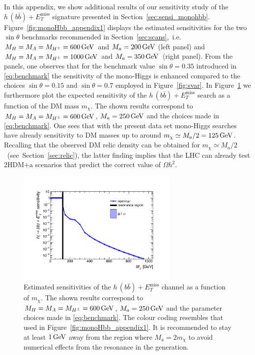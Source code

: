 \documentclass[a4paper, 11pt,notoc]{article}
\newcommand{\MET}{\ensuremath{E_T^\mathrm{miss}}\xspace}
\newcommand{\mA}{\ensuremath{M_{A}}\xspace}
\newcommand{\ma}{\ensuremath{M_{a}}\xspace}
\newcommand{\mH}{\ensuremath{M_{H}}\xspace}
\newcommand{\mHc}{\ensuremath{M_{H^{\pm}}}\xspace}
\newcommand{\hdma}{\ensuremath{\textrm{2HDM+a}}\xspace}
\begin{document}
In this appendix, we  show additional results  of our sensitivity study of the $h \, (b \bar b)+\MET$ signature presented in Section~\ref{sec:sensi_monohbb}. Figure~\ref{fig:monoHbb_appendix1} displays the estimated sensitivities for the two $\sin \theta$ benchmarks recommended in Section~\ref{sec:scans},~i.e.~$\mH = \mA = \mHc = 600 \, {\rm GeV}$ and $\ma = 200 \, {\rm GeV}$ (left panel) and $\mH = \mA = \mHc = 1000 \, {\rm GeV}$ and $\ma = 350 \, {\rm GeV}$~(right panel). From the panels, one observes that for the benchmark value $\sin \theta = 0.35$ introduced in \eqref{eq:benchmark} the sensitivity of the mono-Higgs is enhanced compared to the choices  $\sin \theta = 0.15$ and  $\sin \theta = 0.7$ employed in Figure~\ref{fig:svar}. In Figure~\ref{fig:monoHbb_appendix2} we furthermore  plot the expected sensitivity of the $h \, (b \bar b)+\MET$ search as a function of the DM mass $m_\chi$. The shown results correspond to $\mH = \mA = \mHc = 600 \, {\rm GeV}$, $\ma = 250 \, {\rm GeV}$ and the choices made in \eqref{eq:benchmark}. One sees that with the present data set mono-Higgs searches have already sensitivity to DM masses up to around $m_\chi \simeq \ma/2 = 125 \, {\rm GeV}$. Recalling that the  observed DM relic density can be obtained for $m_\chi \simeq \ma/2$ ~(see~Section~\ref{sec:relic}), the latter finding implies that the LHC can already test  \hdma scenarios that predict the correct value of $\Omega h^2$. 

\begin{figure}[t!]
\centering
\includegraphics[width=0.7\textwidth]{monoHbb_sensi_mDM_scan_red.pdf}
\vspace{-2mm}
\caption{Estimated sensitivities of  the $h \, (b \bar b)+\MET$ channel as a function of $m_\chi$. The shown results correspond to $\mH = \mA = \mHc = 600 \, {\rm GeV}$, $\ma = 250 \, {\rm GeV}$ and the parameter choices made in \eqref{eq:benchmark}. The colour coding resembles that used in Figure~\ref{fig:monoHbb_appendix1}. It is recommended to stay at least $1 \, {\rm GeV}$ away from the region where $\ma = 2 m_\chi$ to avoid numerical effects from the resonance in the generation. }
\label{fig:monoHbb_appendix2}
\end{figure}



\end{document}

